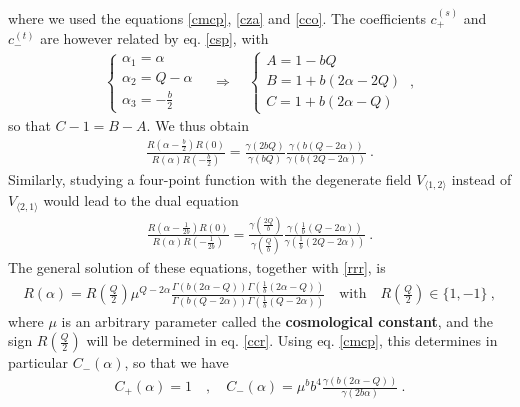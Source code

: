 \documentclass[12pt, a4paper, notitlepage, twoside]{report}
\numberwithin{equation}{section}
\theoremstyle{break}
\begin{document}
where we used the equations \eqref{cmcp}, \eqref{cza} and \eqref{cco}.
The coefficients $c^{(s)}_+$ and $c^{(t)}_-$ are however related by eq. \eqref{csp}, with
\begin{align}
 \left\{\begin{array}{l}  \alpha_1 = \alpha \\ \alpha_2 = Q-\alpha \\ \alpha_3 = -\frac{b}{2} \end{array}\right. \quad \Rightarrow \quad \left\{\begin{array}{l}  A = 1-bQ \\ B = 1+b(2\alpha-2Q) \\ C=1+b(2\alpha-Q) \end{array}\right.  \ ,
\end{align}
so that $C-1=B-A$.
We thus obtain
\begin{align}
 \frac{R(\alpha-\tfrac{b}{2})R(0)}{R(\alpha)R(-\tfrac{b}{2})} = 
\frac{\gamma(2bQ)}{\gamma(bQ)} \frac{\gamma(b(Q-2\alpha))}{\gamma(b(2Q-2\alpha))}\ .
\label{crg}
\end{align}
Similarly, studying a four-point function with the degenerate field $V_{\langle 1,2 \rangle}$ instead of $V_{\langle 2,1 \rangle}$ would lead to the dual equation
\begin{align}
  \frac{R(\alpha-\tfrac{1}{2b})R(0)}{R(\alpha)R(-\tfrac{1}{2b})} = \frac{\gamma(\frac{2Q}{b})}{\gamma(\frac{Q}{b})} \frac{\gamma(\frac{1}{b}(Q-2\alpha))}{\gamma(\frac{1}{b}(2Q-2\alpha))}\ .
\end{align}
The general solution of these equations, together with \eqref{rrr}, is
\begin{align}
 \boxed{R(\alpha) = R(\tfrac{Q}{2})\mu^{Q-2\alpha} \frac{\Gamma(b(2\alpha-Q))\Gamma(\frac{1}{b}(2\alpha-Q))}{\Gamma(b(Q-2\alpha))\Gamma(\frac{1}{b}(Q-2\alpha))}} \quad \text{with} \quad R(\tfrac{Q}{2})\in \{1, -1\}  \ ,
\label{ram}
\end{align}
where $\mu$ is an arbitrary parameter called the \textbf{\boldmath cosmological constant},
and the sign $R(\frac{Q}{2})$ will be determined in eq. \eqref{ccr}.
Using eq. \eqref{cmcp}, this determines in particular $C_-(\alpha)$, so that we have
\begin{align}
 C_+(\alpha)=1 \quad , \quad C_-(\alpha) = \mu^b b^4 \frac{\gamma(b(2\alpha-Q))}{\gamma(2b\alpha)}\ .
\label{cpm}
\end{align}
\end{document}
